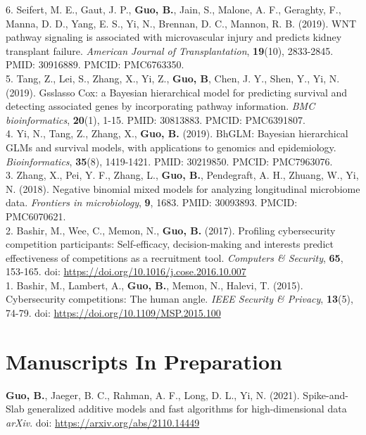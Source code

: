 6. Seifert, M. E., Gaut, J. P., {\bf Guo, B.}, Jain, S., Malone, A. F., Geraghty, F., Manna, D. D., Yang, E. S., Yi, N., Brennan, D. C., Mannon, R. B. (2019). WNT pathway signaling is associated with microvascular injury and predicts kidney transplant failure. {\it American Journal of Transplantation}, {\bf 19}(10), 2833-2845. PMID: 30916889. PMCID: PMC6763350. \\

5. Tang, Z., Lei, S., Zhang, X., Yi, Z.,  {\bf Guo, B}, Chen, J. Y., Shen, Y.,  Yi, N. (2019). Gsslasso Cox: a Bayesian hierarchical model for predicting survival and detecting associated genes by incorporating pathway information. {\it BMC bioinformatics}, {\bf 20}(1), 1-15. PMID: 30813883. PMCID: PMC6391807.\\

4. Yi, N., Tang, Z., Zhang, X., {\bf Guo, B.} (2019). BhGLM: Bayesian hierarchical GLMs and survival models, with applications to genomics and epidemiology. {\it Bioinformatics}, {\bf 35}(8), 1419-1421. PMID: 30219850. PMCID: PMC7963076.\\

3. Zhang, X., Pei, Y. F., Zhang, L., {\bf Guo, B.}, Pendegraft, A. H., Zhuang, W., Yi, N. (2018). Negative binomial mixed models for analyzing longitudinal microbiome data. {\it Frontiers in microbiology}, {\bf 9}, 1683. PMID: 30093893. PMCID: PMC6070621.\\

2. Bashir, M., Wee, C., Memon, N., {\bf Guo, B.} (2017). Profiling cybersecurity competition participants: Self-efficacy, decision-making and interests predict effectiveness of competitions as a recruitment tool. {\it Computers \& Security}, {\bf 65}, 153-165. doi: \url{https://doi.org/10.1016/j.cose.2016.10.007}\\

1. Bashir, M., Lambert, A., {\bf Guo, B.}, Memon, N., Halevi, T. (2015). Cybersecurity competitions: The human angle. {\it IEEE Security \& Privacy}, {\bf 13}(5), 74-79. doi: \url{https://doi.org/10.1109/MSP.2015.100}\\

\section{Manuscripts In Preparation}

\vspace{-3ex}

\textbf{Guo, B.}, Jaeger, B. C., Rahman, A. F., Long, D. L., Yi, N. (2021). Spike-and-Slab generalized additive models and fast algorithms for high-dimensional data {\it arXiv}. doi: \url{https://arxiv.org/abs/2110.14449}\\

